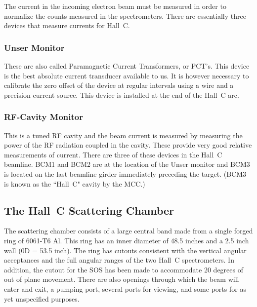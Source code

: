 The current in the incoming electron beam must be measured in order to
normalize the counts measured in the spectrometers. There are essentially
three devices that measure currents for Hall~C.

\subsubsection{Unser Monitor}  These are also called Paramagnetic Current Transformers,
or PCT's. This device is the best absolute current transducer available to us.
It is however necessary to calibrate the zero offset of the device at
regular intervals using a wire and a precision current source. This device
is installed at the end of the Hall~C arc.
\subsubsection{RF-Cavity Monitor} This is a tuned RF cavity and the beam current
is measured by measuring the power of the RF radiation coupled in the cavity.
These provide very good relative measurements of current. There are three
of these
devices in the Hall~C beamline. BCM1 and BCM2 are at the location of the Unser
monitor and BCM3 is located on the last beamline girder
immediately preceding the target.  (BCM3 is known as the ``Hall~C" cavity 
by the MCC.)



\subsection{The Hall~C Scattering Chamber}

The scattering chamber consists of a large central band made from a single
forged ring of 6061-T6 Al. This ring has an inner diameter of
48.5 inches and a  2.5 inch wall (0D = 53.5 inch). The ring has
cutouts consistent with the vertical angular acceptances and the
full angular ranges of the two Hall~C spectrometers. In addition,
the cutout for the SOS has been made to accommodate 20 degrees
of out of plane movement. There are also openings through which the beam
will enter and exit, a pumping port, several ports for viewing, and
some ports for as yet unspecified purposes.

